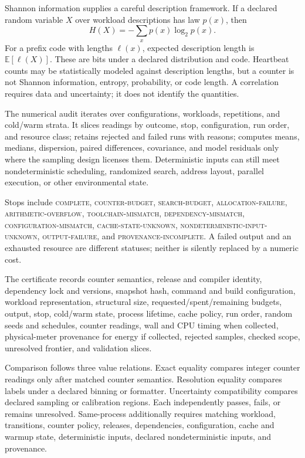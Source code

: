 Shannon information supplies a careful description framework.  If a declared random variable \(X\) over workload
descriptions has law \(p(x)\), then
\[
                         H(X)=-\sum_xp(x)\log_2p(x).
\]
For a prefix code with lengths \(\ell(x)\), expected description length is
\(\mathbb E[\ell(X)]\).  These are bits under a declared distribution and code.  Heartbeat counts may be statistically
modeled against description lengths, but a counter is not Shannon information, entropy, probability, or code length.
A correlation requires data and uncertainty; it does not identify the quantities.

The numerical audit iterates over configurations, workloads, repetitions, and cold/warm strata.  It slices readings
by outcome, stop, configuration, run order, and resource class; retains rejected and failed runs with reasons; computes
means, medians, dispersion, paired differences, covariance, and model residuals only where the sampling design
licenses them.  Deterministic inputs can still meet nondeterministic scheduling, randomized search, address layout,
parallel execution, or other environmental state.

Stops include \textsc{complete}, \textsc{counter-budget}, \textsc{search-budget}, \textsc{allocation-failure},
\textsc{arithmetic-overflow}, \textsc{toolchain-mismatch}, \textsc{dependency-mismatch},
\textsc{configuration-mismatch}, \textsc{cache-state-unknown}, \textsc{nondeterministic-input-unknown},
\textsc{output-failure}, and \textsc{provenance-incomplete}.  A failed output and an exhausted resource are different
statuses; neither is silently replaced by a numeric cost.

The certificate records counter semantics, release and compiler identity, dependency lock and versions, snapshot
hash, command and build configuration, workload representation, structural size, requested/spent/remaining budgets,
output, stop, cold/warm state, process lifetime, cache policy, run order, random seeds and schedules, counter readings,
wall and CPU timing when collected, physical-meter provenance for energy if collected, rejected samples, checked
scope, unresolved frontier, and validation slices.

Comparison follows three value relations.  Exact equality compares integer counter readings only after matched
counter semantics.  Resolution equality compares labels under a declared binning or formatter.  Uncertainty
compatibility compares declared sampling or calibration regions.  Each independently passes, fails, or remains
unresolved.  Same-process additionally requires matching workload, transitions, counter policy, releases,
dependencies, configuration, cache and warmup state, deterministic inputs, declared nondeterministic inputs, and
provenance.

